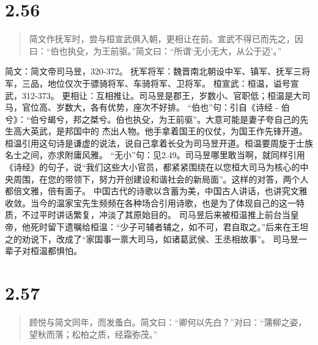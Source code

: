 \documentclass[]{book}
\begin{document}
\section{2.56}\label{section-102}

\begin{quote}
简文作抚军时，尝与桓宣武俱入朝，更相让在前。宣武不得已而先之，因曰：``伯也执殳，为王前驱。''简文曰：``所谓`无小无大，从公于迈'。''
\end{quote}

简文：简文帝司马昱，320-372。
抚军将军：魏晋南北朝设中军、镇军、抚军三将军，三品，地位仅次于骠骑将军、车骑将军、卫将军。
桓宣武：桓温，谥号宣武，312-373。
更相让：互相推让。司马昱是郡王，岁数小、官职低；桓温是大司马，官位高、岁数大，各有优势，座次不好排。
``伯也''句：引自《诗经 -
伯兮》：``伯兮朅兮，邦之桀兮。伯也执殳，为王前驱''。大意可能是妻子夸自己的先生高大英武，是邦国中的
杰出人物。他手拿着国王的仪仗，为国王作先锋开道。桓温引用这句诗是谦虚的说法，说自己拿着长殳为司马昱开道。桓温要周旋于士族名士之间，亦求附庸风雅。
``无小''句：见2.49。司马昱哪里敢当啊，就同样引用《诗经》的句子，说``我们这些大小官员，都紧紧围绕在以您桓大司马为核心的中央周围，在您的带领下，努力开创建设和谐社会的新局面''。这样的对答，两个人都倍文雅，倍有面子。
中国古代的诗歌以含蓄为美，中国古人讲话，也讲究文雅收敛。当今的温家宝先生频频在各种场合引用诗歌，也是为了体现自己的这一特质，不过平时讲话繁复，冲淡了其原始目的。
司马昱后来被桓温推上前台当皇帝，他死时留下遗嘱给桓温：``少子可辅者辅之，如不可，君自取之。''后来在王坦之的劝说下，改成了``家国事一禀大司马，如诸葛武侯、王丞相故事''。
司马昱一辈子对桓温都惧怕。

\section{2.57}\label{section-103}

\begin{quote}
顾悦与简文同年，而发蚤白。简文曰：``卿何以先白？''对曰：``蒲柳之姿，望秋而落；松柏之质，经霜弥茂。''
\end{quote}
\end{document}
